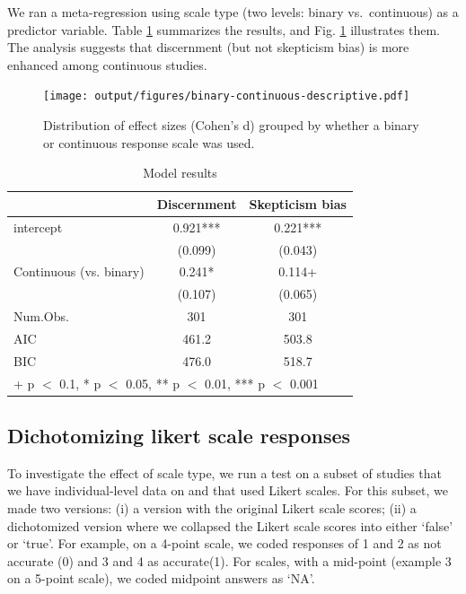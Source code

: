 \documentclass[
  doc,floatsintext]{apa6}
\begin{document}
We ran a meta-regression using scale type (two levels: binary vs.~continuous) as a predictor variable. Table \ref{tab:binary-vs-continuous-regression} summarizes the results, and Fig. \ref{fig:binary-continuous-descriptive} illustrates them. The analysis suggests that discernment (but not skepticism bias) is more enhanced among continuous studies.



\begin{figure}
\centering
\texttt{[image: output/figures/binary-continuous-descriptive.pdf]}
\caption{\label{fig:binary-continuous-descriptive}Distribution of effect sizes (Cohen's d) grouped by whether a binary or continuous response scale was used.}
\end{figure}

\begin{table}

\caption{\label{tab:binary-vs-continuous-regression}Model results}
\centering
\begin{tabular}[t]{lcc}
\toprule
  & Discernment & Skepticism  bias\\
\midrule
intercept & 0.921*** & 0.221***\\
 & (0.099) & (0.043)\\
Continuous (vs. binary) & 0.241* & 0.114+\\
 & (0.107) & (0.065)\\
\midrule
Num.Obs. & 301 & 301\\
AIC & 461.2 & 503.8\\
BIC & 476.0 & 518.7\\
\bottomrule
\multicolumn{3}{l}{\rule{0pt}{1em}+ p $<$ 0.1, * p $<$ 0.05, ** p $<$ 0.01, *** p $<$ 0.001}\\
\end{tabular}
\end{table}

\subsection{Dichotomizing likert scale responses}\label{dichotomizing-likert-scale-responses}

To investigate the effect of scale type, we run a test on a subset of studies that we have individual-level data on and that used Likert scales. For this subset, we made two versions: (i) a version with the original Likert scale scores; (ii) a dichotomized version where we collapsed the Likert scale scores into either `false' or `true'. For example, on a 4-point scale, we coded responses of 1 and 2 as not accurate (0) and 3 and 4 as accurate(1). For scales, with a mid-point (example 3 on a 5-point scale), we coded midpoint answers as `NA'.
\end{document}
